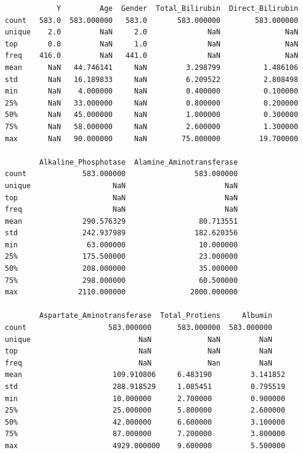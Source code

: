\documentclass[
  11pt,
  a4paper,
]{article}
\begin{document}
\begin{verbatim}
            Y         Age  Gender  Total_Bilirubin  Direct_Bilirubin  
count   583.0  583.000000   583.0       583.000000        583.000000   
unique    2.0         NaN     2.0              NaN               NaN   
top       0.0         NaN     1.0              NaN               NaN   
freq    416.0         NaN   441.0              NaN               NaN   
mean      NaN   44.746141     NaN         3.298799          1.486106   
std       NaN   16.189833     NaN         6.209522          2.808498   
min       NaN    4.000000     NaN         0.400000          0.100000   
25%       NaN   33.000000     NaN         0.800000          0.200000   
50%       NaN   45.000000     NaN         1.000000          0.300000   
75%       NaN   58.000000     NaN         2.600000          1.300000   
max       NaN   90.000000     NaN        75.000000         19.700000   

        Alkaline_Phosphotase  Alamine_Aminotransferase  
count             583.000000                583.000000   
unique                   NaN                       NaN   
top                      NaN                       NaN   
freq                     NaN                       NaN   
mean              290.576329                 80.713551   
std               242.937989                182.620356   
min                63.000000                 10.000000   
25%               175.500000                 23.000000   
50%               208.000000                 35.000000   
75%               298.000000                 60.500000   
max              2110.000000               2000.000000   

        Aspartate_Aminotransferase  Total_Protiens     Albumin  
count                   583.000000      583.000000  583.000000   
unique                         NaN             NaN         NaN   
top                            NaN             NaN         NaN   
freq                           NaN             Nan         NaN                      
mean                     109.910806     6.483190         3.141852
std                      288.918529     1.085451         0.795519
min                      10.000000      2.700000         0.900000
25%                      25.000000      5.800000         2.600000
50%                      42.000000      6.600000         3.100000
75%                      87.000000      7.200000         3.800000
max                      4929.000000    9.600000         5.500000
\end{verbatim}
\end{document}
